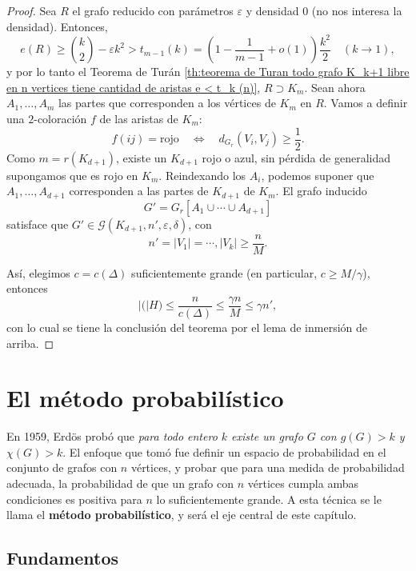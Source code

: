 \documentclass[12pt]{report}
\theoremstyle{plain}
\theoremstyle{definition}
\newcommand{\abs}[1]{\left \vert #1 \right \vert}
\begin{document}
\begin{proof}
Sea $R$ el grafo reducido con parámetros $\varepsilon$ y densidad $0$ (no nos interesa la densidad). Entonces,
\[
    e(R) \geq \binom k 2     - \varepsilon k^2 > t_{m-1} (k) = \left ( 1 - \frac{1}{m-1} + o(1) \right) \frac{k^2}{2}  \quad (k \longrightarrow 1),
\]
y por lo tanto el Teorema de Turán \ref{th:teorema de Turan todo grafo K_k+1 libre en n vertices tiene cantidad de aristas e < t_k (n)}, $R \supset K_m$. Sean ahora $A_1, \ldots, A_m$ las partes que corresponden a los vértices de $K_m$ en $R$. Vamos a definir una $2$-coloración $f$ de las aristas de $K_m$:
\[
    f(ij) = \text{rojo} \quad \Leftrightarrow \quad d_{G_r} (V_i, V_j) \geq \frac{1}{2}.
\]
Como $m = r (K_{d + 1})$, existe un $K_{d + 1}$ rojo o azul, sin pérdida de generalidad supongamos que es rojo en $K_m$. Reindexando los $A_i$, podemos suponer que $A_1, \ldots, A_{d+1}$ corresponden a las partes de $K_{d+1}$ de $K_m$. El grafo inducido
\[
    G' = G_r [A_1 \cup \cdots \cup A_{d+1}]
\]
satisface que $G' \in \mathcal G (K_{d+1}, n', \varepsilon, \delta)$, con
\[
    n' = \abs{V_1} = \cdots, \abs{V_k} \geq \frac{n}{M}.
\]

Así, elegimos $c = c(\Delta)$ suficientemente grande (en particular, $c \geq M/\gamma$), entonces
\[
    \abs (H) \leq \frac{n}{c(\Delta)} \leq \frac{\gamma n}{M} \leq \gamma n',
\]
con lo cual se tiene la conclusión del teorema por el lema de inmersión de arriba.
\end{proof}







\chapter{El método probabilístico}

En 1959, Erdös probó que \textit{para todo entero $k$ existe un grafo $G$ con $g(G)>k$ y $\chi (G) > k$}. El enfoque que tomó fue definir un espacio de probabilidad en el conjunto de grafos con $n$ vértices, y probar que para una medida de probabilidad adecuada, la probabilidad de que un grafo con $n$ vértices cumpla ambas condiciones es positiva para $n$ lo suficientemente grande. A esta técnica se le llama el \textbf{método probabilístico}, y será el eje central de este capítulo.


\section{Fundamentos}
\end{document}

